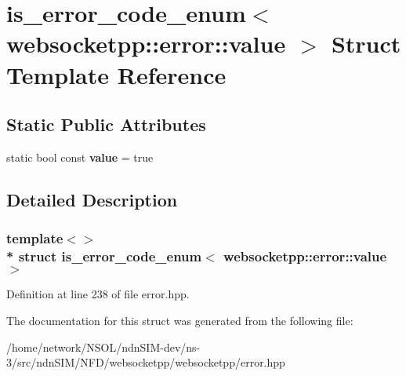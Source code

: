 \hypertarget{structis__error__code__enum_3_01websocketpp_1_1error_1_1value_01_4}{}\section{is\+\_\+error\+\_\+code\+\_\+enum$<$ websocketpp\+:\+:error\+:\+:value $>$ Struct Template Reference}
\label{structis__error__code__enum_3_01websocketpp_1_1error_1_1value_01_4}
\subsection*{Static Public Attributes}
\begin{DoxyCompactItemize}
\item 
static bool const {\bfseries value} = true\hypertarget{structis__error__code__enum_3_01websocketpp_1_1error_1_1value_01_4_afe39d82e019d6303d21a6438f11fc453}{}\label{structis__error__code__enum_3_01websocketpp_1_1error_1_1value_01_4_afe39d82e019d6303d21a6438f11fc453}

\end{DoxyCompactItemize}


\subsection{Detailed Description}
\subsubsection*{template$<$$>$\\*
struct is\+\_\+error\+\_\+code\+\_\+enum$<$ websocketpp\+::error\+::value $>$}



Definition at line 238 of file error.\+hpp.



The documentation for this struct was generated from the following file\+:\begin{DoxyCompactItemize}
\item 
/home/network/\+N\+S\+O\+L/ndn\+S\+I\+M-\/dev/ns-\/3/src/ndn\+S\+I\+M/\+N\+F\+D/websocketpp/websocketpp/error.\+hpp\end{DoxyCompactItemize}
